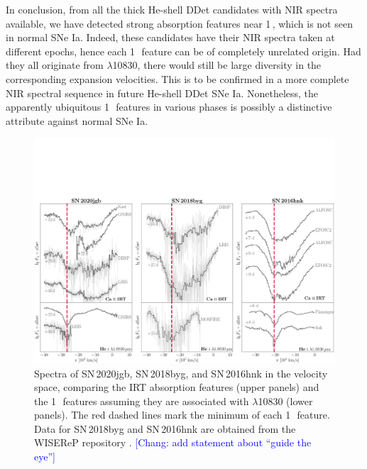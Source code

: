 \documentclass[twocolumn]{aastex631}
\newcommand{\sn}{SN\,2020jgb}
\newcommand{\chang}[1]{\textcolor{blue}{[Chang: #1]}}
\begin{document}
{In conclusion, from all the thick He-shell DDet candidates with NIR spectra available, we have detected strong absorption features near 1\,\micron, which is not seen in normal SNe Ia. Indeed, these candidates have their NIR spectra taken at different epochs, hence each 1\,\micron\ feature can be of completely unrelated origin. Had they all originate from  $\lambda$10830, there would still be large diversity in the corresponding expansion velocities. This is to be confirmed in a more complete NIR spectral sequence in future He-shell DDet SNe Ia. Nonetheless, the apparently ubiquitous 1\,\micron\ features in various phases is possibly a distinctive attribute against normal SNe Ia.

\begin{figure}
    \centering
    \includegraphics[width=\textwidth]{CaII_HeI_hvf.pdf}
    \caption{Spectra of \sn, SN\,2018byg, and SN\,2016hnk in the velocity space, comparing the  IRT absorption features (upper panels) and the 1\,\micron\ features assuming they are associated with  $\lambda$10830 (lower panels). The red dashed lines mark the minimum of each 1\,\micron\ feature. Data for SN\,2018byg and SN\,2016hnk are obtained from the WISEReP repository \citep{wiserep_2012}. \chang{add statement about ``guide the eye''}}
    \label{fig:hvf_comp}
\end{figure}

}
\end{document}
